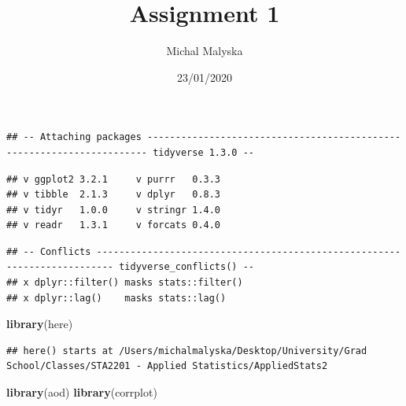 \documentclass[]{article}
\title{Assignment 1}
\author{Michal Malyska}
\date{23/01/2020}
\newenvironment{Shaded}{\begin{snugshade}}{\end{snugshade}}
\newcommand{\DataTypeTok}[1]{\textcolor[rgb]{0.13,0.29,0.53}{#1}}
\newcommand{\KeywordTok}[1]{\textcolor[rgb]{0.13,0.29,0.53}{\textbf{#1}}}
\newcommand{\NormalTok}[1]{#1}
\newcommand{\OperatorTok}[1]{\textcolor[rgb]{0.81,0.36,0.00}{\textbf{#1}}}
\newcommand{\OtherTok}[1]{\textcolor[rgb]{0.56,0.35,0.01}{#1}}
\begin{document}
\maketitle

\begin{Shaded}
\end{Shaded}

\begin{verbatim}
## -- Attaching packages ---------------------------------------------------------------------- tidyverse 1.3.0 --
\end{verbatim}

\begin{verbatim}
## v ggplot2 3.2.1     v purrr   0.3.3
## v tibble  2.1.3     v dplyr   0.8.3
## v tidyr   1.0.0     v stringr 1.4.0
## v readr   1.3.1     v forcats 0.4.0
\end{verbatim}

\begin{verbatim}
## -- Conflicts ------------------------------------------------------------------------- tidyverse_conflicts() --
## x dplyr::filter() masks stats::filter()
## x dplyr::lag()    masks stats::lag()
\end{verbatim}

\begin{Shaded}
\begin{Highlighting}[]
\KeywordTok{library}\NormalTok{(here)}
\end{Highlighting}
\end{Shaded}

\begin{verbatim}
## here() starts at /Users/michalmalyska/Desktop/University/Grad School/Classes/STA2201 - Applied Statistics/AppliedStats2
\end{verbatim}

\begin{Shaded}
\begin{Highlighting}[]
\KeywordTok{library}\NormalTok{(aod)}
\KeywordTok{library}\NormalTok{(corrplot)}
\end{Highlighting}
\end{Shaded}
\end{document}
